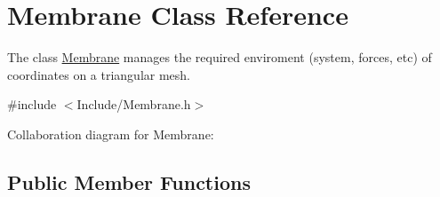 \hypertarget{classMembrane}{}\section{Membrane Class Reference}
\label{classMembrane}


The class \textquotesingle{}\mbox{\hyperlink{classMembrane}{Membrane}}\textquotesingle{} manages the required enviroment (system, forces, etc) of coordinates on a triangular mesh.  




{\ttfamily \#include $<$Include/\+Membrane.\+h$>$}



Collaboration diagram for Membrane\+:
\subsection*{Public Member Functions}
